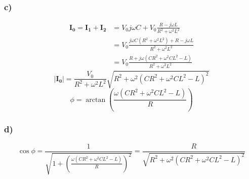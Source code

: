 \documentclass[../homework.tex]{subfiles}
\begin{document}
\subsubsection*{c)}
\begin{align*}
    \mathbf{I_0} = \mathbf{I_1 + I_2} & = V_0 j \omega C + V_0 \frac{R - j \omega L}{R^2 + \omega^2 L^2}                  \\
                                      & = V_0 \frac{j \omega C (R^2 + \omega^2 L^2) + R - j \omega L}{R^2 + \omega^2 L^2} \\
                                      & = V_0 \frac{R + j \omega (CR^2 + \omega^2 C L^2 - L)}{R^2 + \omega^2 L^2}
\end{align*}
\begin{equation*}
    |\mathbf{I_0}| = \frac{V_0}{R^2 + \omega^2 L^2} \sqrt{R^2 + \omega^2 (CR^2 + \omega^2 C L^2 - L)^2}
\end{equation*}
\begin{equation*}
    \phi = \arctan \left( \frac{\omega(CR^2 + \omega^2 C L^2 - L)}{R} \right)
\end{equation*}

\subsubsection*{d)}
\begin{equation*}
    \cos{\phi} = \frac{1}{\sqrt{1 + \left( \frac{\omega(CR^2 + \omega^2 C L^2 - L)}{R} \right)^2}} = \frac{R}{\sqrt{R^2 + \omega^2 (CR^2 + \omega^2 C L^2 - L)^2}}
\end{equation*}
\end{document}
